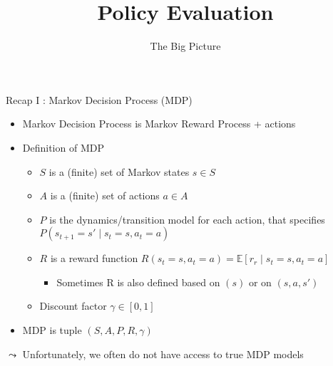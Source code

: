 \documentclass[aspectratio=169]{../latex_main/tntbeamer}  %
\title[Reinforcement Learning: Policy Evaluation]{Policy Evaluation}
\subtitle{The Big Picture}
\begin{document}
	
	\maketitle

\begin{frame}[c]{Recap I : Markov Decision Process (MDP)}

\begin{itemize}
	\item Markov Decision Process is Markov Reward Process + actions
	\item Definition of MDP
	\begin{itemize}
		\item $S$ is a (finite) set of Markov states $s \in S$
		\item $A$ is a (finite) set of actions $a \in A$
		\item $P$ is the dynamics/transition model for each action, that specifies $P(s_{t+1} = s' \mid s_t=s, a_t=a)$
		\item $R$ is a reward function 
		$R(s_t=s, a_t=a) = \mathbb{E}[r_r \mid s_t=s, a_t=a] $
		\begin{itemize}
			\item Sometimes R is also defined based on $(s)$ or on $(s,a,s')$
		\end{itemize}
		\item Discount factor $\gamma \in [0, 1]$
	\end{itemize}
	\item MDP is tuple $(S,A,P, R, \gamma)$
\end{itemize}

\pause

\medskip
$\leadsto$ Unfortunately, we often do not have access to true MDP models

\end{frame}
\end{document}
